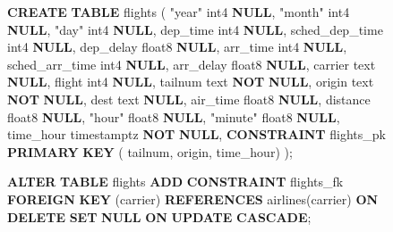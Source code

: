 \documentclass[
  10pt,
  titlepage=false]{exam}
\newenvironment{Shaded}{\begin{snugshade}}{\end{snugshade}}
\newcommand{\KeywordTok}[1]{\textcolor[rgb]{0.00,0.23,0.31}{\textbf{#1}}}
\newcommand{\NormalTok}[1]{\textcolor[rgb]{0.00,0.23,0.31}{#1}}
\newcommand{\OtherTok}[1]{\textcolor[rgb]{0.00,0.23,0.31}{#1}}
\begin{document}
\begin{figure}

\begin{minipage}{0.50\linewidth}

\begin{Shaded}
\begin{Highlighting}[]
\KeywordTok{CREATE} \KeywordTok{TABLE}\NormalTok{ flights (}
    \OtherTok{"year"}\NormalTok{ int4 }\KeywordTok{NULL}\NormalTok{,}
    \OtherTok{"month"}\NormalTok{ int4 }\KeywordTok{NULL}\NormalTok{,}
    \OtherTok{"day"}\NormalTok{ int4 }\KeywordTok{NULL}\NormalTok{,}
\NormalTok{    dep\_time int4 }\KeywordTok{NULL}\NormalTok{,}
\NormalTok{    sched\_dep\_time int4 }\KeywordTok{NULL}\NormalTok{,}
\NormalTok{    dep\_delay float8 }\KeywordTok{NULL}\NormalTok{,}
\NormalTok{    arr\_time int4 }\KeywordTok{NULL}\NormalTok{,}
\NormalTok{    sched\_arr\_time int4 }\KeywordTok{NULL}\NormalTok{,}
\NormalTok{    arr\_delay float8 }\KeywordTok{NULL}\NormalTok{,}
\NormalTok{    carrier text }\KeywordTok{NULL}\NormalTok{,}
\NormalTok{    flight int4 }\KeywordTok{NULL}\NormalTok{,}
\NormalTok{    tailnum text }\KeywordTok{NOT} \KeywordTok{NULL}\NormalTok{,}
\NormalTok{    origin text }\KeywordTok{NOT} \KeywordTok{NULL}\NormalTok{,}
\NormalTok{    dest text }\KeywordTok{NULL}\NormalTok{,}
\NormalTok{    air\_time float8 }\KeywordTok{NULL}\NormalTok{,}
\NormalTok{    distance float8 }\KeywordTok{NULL}\NormalTok{,}
    \OtherTok{"hour"}\NormalTok{ float8 }\KeywordTok{NULL}\NormalTok{,}
    \OtherTok{"minute"}\NormalTok{ float8 }\KeywordTok{NULL}\NormalTok{,}
\NormalTok{    time\_hour timestamptz }\KeywordTok{NOT} \KeywordTok{NULL}\NormalTok{,}
    \KeywordTok{CONSTRAINT}\NormalTok{ flights\_pk }
        \KeywordTok{PRIMARY} \KeywordTok{KEY}\NormalTok{ (}
\NormalTok{            tailnum, origin, time\_hour)}
\NormalTok{);}
\end{Highlighting}
\end{Shaded}

\end{minipage}%
%
\begin{minipage}{0.50\linewidth}

\begin{Shaded}
\begin{Highlighting}[]
\KeywordTok{ALTER} \KeywordTok{TABLE}\NormalTok{ flights }\KeywordTok{ADD} 
    \KeywordTok{CONSTRAINT}\NormalTok{ flights\_fk }
    \KeywordTok{FOREIGN} \KeywordTok{KEY}\NormalTok{ (carrier) }
    \KeywordTok{REFERENCES}\NormalTok{ airlines(carrier) }
    \KeywordTok{ON} \KeywordTok{DELETE} \KeywordTok{SET} \KeywordTok{NULL} 
    \KeywordTok{ON} \KeywordTok{UPDATE} \KeywordTok{CASCADE}\NormalTok{;}
\end{Highlighting}
\end{Shaded}


\end{minipage}
\end{figure}
\end{document}
